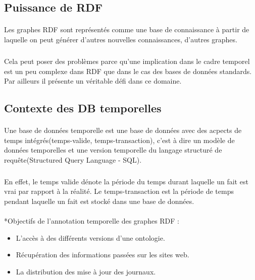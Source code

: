 \subsection*{Puissance de RDF}
\paragraph{}
Les graphes RDF sont représentés comme une base de connaissance à partir de laquelle on peut générer d’autres nouvelles connaissances, d’autres graphes.
\subparagraph{}
Cela peut poser des problèmes parce qu'une implication dans le cadre temporel est un peu complexe dans RDF que dans le cas des bases de données standards. Par ailleurs il présente un véritable défi dans ce domaine.
\subsection*{Contexte des DB temporelles}
\paragraph{}
Une base de données temporelle est une base de données avec des acpects de temps intégrés(temps-valide, temps-transaction), c'est à dire un modèle de données temporelles et une version temporelle du langage structuré de requête(Structured Query Language - SQL).
\subparagraph{}
En effet, le temps valide dénote la période du temps durant laquelle un fait est vrai par rapport à la réalité.
Le temps-transaction est la période de temps pendant laquelle un fait est stocké dans une base de données.
\paragraph{}
*Objectifs de l'annotation temporelle des graphes RDF :
\begin{itemize}
\item L'accès à des différents versions d’une ontologie.
\item Récupération des informations passées sur les sites web.
\item La distribution des mise à jour des journaux.
\end{itemize}
